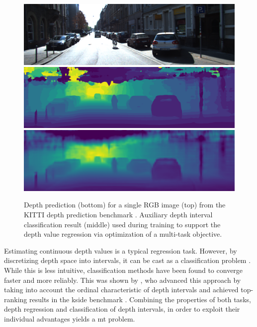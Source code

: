 \documentclass[lang=english]{tumarxivarticle}
\newcommand{\citep}{\parencite}
\newcommand{\citet}{\textcite}
\begin{document}
\begin{figure}[t!]
  \includegraphics[trim=0 0 0 110,clip,width=\linewidth]{figures/result_images/intro_rgb} \\[2mm]
  \includegraphics[trim=0 0 0 110,clip,width=\linewidth]{figures/result_images/intro_cls} \\[2mm]
  \includegraphics[trim=0 0 0 110,clip,width=\linewidth]{figures/result_images/intro_reg}
  \caption{Depth prediction (bottom) for a single RGB image (top) from the KITTI depth prediction benchmark \citep{Uhrig17, Geiger13}.
  Auxiliary depth interval classification result (middle) used during training to support the depth value regression via optimization of a multi-task objective.}
  \label{fig:intro_example}
  \vspace{-0.4cm}
\end{figure}

Estimating continuous depth values is a typical regression task.
However, by discretizing depth space into intervals, it can be cast as a classification problem \citep{Cao18,Gurram18,Fu18}.
While this is less intuitive, classification methods have been found to converge faster and more reliably.
This was shown by \citet{Fu18}, who advanced this approach by taking into account the ordinal characteristic of depth intervals and achieved top-ranking results in the \gls{kside} benchmark \citep{Uhrig17,Geiger13}.
Combining the properties of both tasks, \ie depth regression and classification of depth intervals, in order to exploit their individual advantages yields a \gls{mt} problem.
\end{document}
